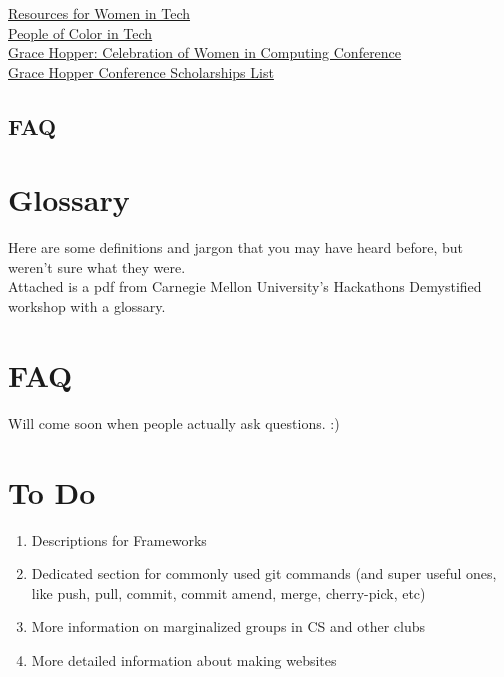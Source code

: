 \documentclass{article}
\begin{document}
\href{https://github.com/cristianoliveira/awesome4girls}{Resources for Women in Tech} \\

\href{http://peopleofcolorintech.com/}{People of Color in Tech}\\

\href{http://ghc.anitaborg.org/}{Grace Hopper: Celebration of Women in Computing Conference}\\

\href{https://github.com/freialobo/GHC-Scholarships}{Grace Hopper Conference Scholarships List}\\
\subsection{FAQ}
\newpage
\section{Glossary}
\label{sec:glossary}
\hspace{0.5cm} Here are some definitions and jargon that you may have heard before, but weren't sure what they were. \\

Attached is a pdf from Carnegie Mellon University's Hackathons Demystified workshop with a glossary. \\

\newpage
\section {FAQ}
Will come soon when people actually ask questions. :) 
\begin{enumerate}
\end{enumerate}
\newpage
\section{To Do}
\begin{enumerate}
\item Descriptions for Frameworks 
\item Dedicated section for commonly used git commands (and super useful ones, like push, pull, commit, commit amend, merge, cherry-pick, etc)
\item More information on marginalized groups in CS and other clubs
\item More detailed information about making websites
\end{enumerate}
\end{document}
